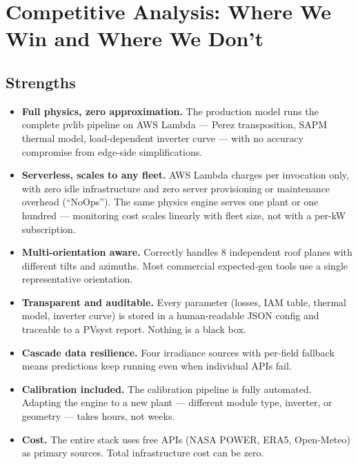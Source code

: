 \documentclass[11pt, a4paper]{article}
\newcommand{\highlight}[1]{\textbf{\color{brandblue}#1}}
\begin{document}
\section{Competitive Analysis: Where We Win and Where We Don't}

\subsection{Strengths}

\begin{itemize}
  \item \highlight{Full physics, zero approximation.} The production model
    runs the complete pvlib pipeline on AWS Lambda --- Perez transposition,
    SAPM thermal model, load-dependent inverter curve --- with no accuracy
    compromise from edge-side simplifications.
  \item \highlight{Serverless, scales to any fleet.} AWS Lambda charges
    per invocation only, with zero idle infrastructure and zero server
    provisioning or maintenance overhead (``NoOps''). The same physics
    engine serves one plant or one hundred --- monitoring cost scales
    linearly with fleet size, not with a per-kW subscription.
  \item \highlight{Multi-orientation aware.} Correctly handles 8 independent
    roof planes with different tilts and azimuths. Most commercial expected-gen
    tools use a single representative orientation.
  \item \highlight{Transparent and auditable.} Every parameter (losses, IAM
    table, thermal model, inverter curve) is stored in a human-readable JSON
    config and traceable to a PVsyst report. Nothing is a black box.
  \item \highlight{Cascade data resilience.} Four irradiance sources with
    per-field fallback means predictions keep running even when individual
    APIs fail.
  \item \highlight{Calibration included.} The calibration pipeline is
    fully automated. Adapting the engine to a new plant --- different
    module type, inverter, or geometry --- takes hours, not weeks.
  \item \highlight{Cost.} The entire stack uses free APIs (NASA POWER, ERA5,
    Open-Meteo) as primary sources. Total infrastructure cost can be zero.
\end{itemize}
\end{document}
